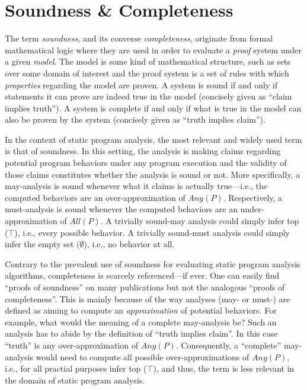 \section{Soundness \& Completeness}
\label{sec:back:soundness}

The term \emph{soundness}, and its converse \emph{completeness}, originate from formal mathematical logic where they are used in order to evaluate a \emph{proof} system under a given \emph{model}. The model is some kind of mathematical structure, such as sets over some domain of interest and the proof system is a set of rules with which \emph{properties} regarding the model are proven. A system is sound if and only if statements it can prove are indeed true in the model (concisely given as ``claim implies truth''). A system is complete if and only if what is true in the model can also be proven by the system (concisely given as ``truth implies claim'').

In the context of static program analysis, the most relevant and widely used term is that of soundness. In this setting, the analysis is making claims regarding potential program behaviors under any program execution and the validity of those claims constitutes whether the analysis is sound or not. More specifically, a may-analysis is sound whenever what it claims is actually true---i.e., the computed behaviors are an over-approximation of $Any(P)$. Respectively, a must-analysis is sound whenever the computed behaviors are an under-approximation of $All(P)$. A trivially sound-may analysis could simply infer top ($\top$), i.e., every possible behavior. A trivially sound-must analysis could simply infer the empty set ($\emptyset$), i.e., no behavior at all.

Contrary to the prevalent use of soundness for evaluating static program analysis algorithms, completeness is scarcely referenced---if ever. One can easily find ``proofs of soundness'' on many publications but not the analogous ``proofs of completeness''. This is mainly because of the way analyses (may- or must-) are defined as aiming to compute an \emph{approximation} of potential behaviors. For example, what would the meaning of a complete may-analysis be? Such an analysis has to abide by the definition of ``truth implies claim''. In this case ``truth'' is any over-approximation of $Any(P)$. Consequently, a ``complete'' may-analysis would need to compute all possible over-approximations of $Any(P)$, i.e., for all practial purposes infer top ($\top$), and thus, the term is less relevant in the domain of static program analysis.

